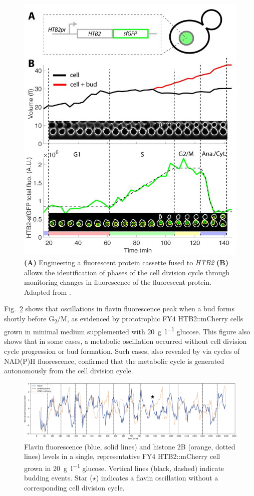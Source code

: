 \begin{figure}[hb!]
  \centering
    \includegraphics[width=0.45\linewidth]{garmendia-torresMultipleInputsEnsure2018_1_adapted.jpg}
    \caption[
      Engineering a fluorescent protein cassette fused to \textit{HTB2} allows the identification of phases of the cell division cycle through monitoring changes in fluorescence of the fluorescent protein.
    ]{
      \textbf{(A)} Engineering a fluorescent protein cassette fused to \textit{HTB2} \textbf{(B)} allows the identification of phases of the cell division cycle through monitoring changes in fluorescence of the fluorescent protein.
      Adapted from \textcite{garmendia-torresMultipleInputsEnsure2018}.
    }
  \label{fig:biology-htb2}
\end{figure}

Fig.\ \ref{fig:biology-highglc-single} shows that oscillations in flavin fluorescence peak when a bud forms shortly before G\textsubscript{2}/M, as evidenced by prototrophic FY4 HTB2::mCherry cells grown in minimal medium supplemented with \SI{20}{\gram~\litre^{-1}} glucose.
This figure also shows that in some cases, a metabolic oscillation occurred without cell division cycle progression or bud formation.
Such cases, also revealed by \textcite{papagiannakisAutonomousMetabolicOscillations2017} via cycles of NAD(P)H fluorescence, confirmed that the metabolic cycle is generated autonomously from the cell division cycle.

\begin{figure}[htb!]
  \centering
    \includegraphics[width=1.0\linewidth]{single_birth_plot_edit.pdf}
    \caption[
      Flavin fluorescence and histone 2B levels in a single, representative FY4 HTB2::mCherry cell grown in \SI{20}{\gram~\litre^{-1}} glucose.
    ]{
      Flavin fluorescence (blue, solid lines) and histone 2B (orange, dotted lines) levels in a single, representative FY4 HTB2::mCherry cell grown in \SI{20}{\gram~\litre^{-1}} glucose.
      Vertical lines (black, dashed) indicate budding events.
      Star ($\star$) indicates a flavin oscillation without a corresponding cell division cycle.
    }
  \label{fig:biology-highglc-single}
\end{figure}

